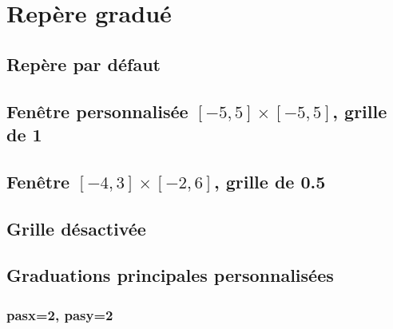 \documentclass[11pt,a4paper]{article}
\begin{document}
\begin{center}
\end{center}

\section{Repère gradué}

\subsection{Repère par défaut}

\begin{center}
\reperegradue
\end{center}

\subsection{Fenêtre personnalisée $[-5,5]\times[-5,5]$, grille de 1}

\begin{center}
\reperegradue[bg={(-5,-5)}, hd={(5,5)}, grille=1]
\end{center}

\subsection{Fenêtre $[-4,3]\times[-2,6]$, grille de 0.5}

\begin{center}
\reperegradue[bg={(-4,-2)}, hd={(3,6)}, grille=0.5]
\end{center}

\subsection{Grille désactivée}

\begin{center}
\reperegradue[bg={(-5,-5)}, hd={(5,5)}, grille=0]
\end{center}

\subsection{Graduations principales personnalisées}

\subsubsection{pasx=2, pasy=2}
\end{document}
